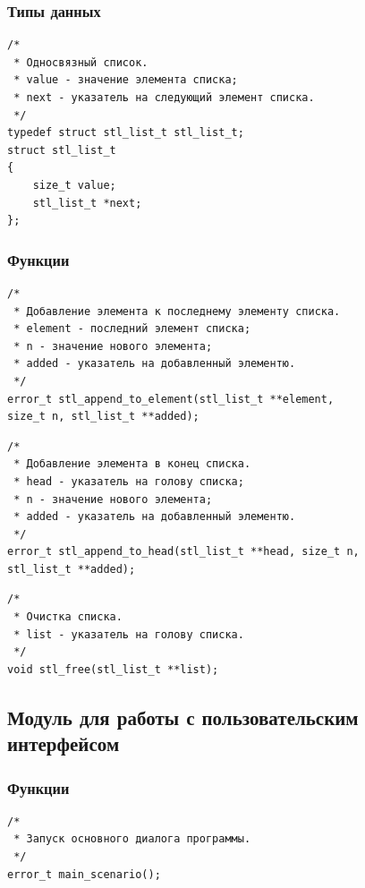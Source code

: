 \documentclass[a4paper,12pt]{extarticle}
\begin{document}
\subsubsection{Типы данных}
\begin{verbatim}
/*
 * Односвязный список.
 * value - значение элемента списка;
 * next - указатель на следующий элемент списка.
 */
typedef struct stl_list_t stl_list_t;
struct stl_list_t
{
    size_t value;
    stl_list_t *next;
};
\end{verbatim}




\subsubsection{Функции}
\begin{verbatim}
/*
 * Добавление элемента к последнему элементу списка.
 * element - последний элемент списка;
 * n - значение нового элемента;
 * added - указатель на добавленный элементю.
 */
error_t stl_append_to_element(stl_list_t **element, 
size_t n, stl_list_t **added);
\end{verbatim}


 \vspace{0.5cm}

\begin{verbatim}
/*
 * Добавление элемента в конец списка.
 * head - указатель на голову списка;
 * n - значение нового элемента;
 * added - указатель на добавленный элементю.
 */
error_t stl_append_to_head(stl_list_t **head, size_t n,
stl_list_t **added);
\end{verbatim}


 \vspace{0.5cm}

\begin{verbatim}
/*
 * Очистка списка.
 * list - указатель на голову списка.
 */
void stl_free(stl_list_t **list);
\end{verbatim}


 \vspace{0.5cm}

\subsection{Модуль для работы с пользовательским интерфейсом}
\subsubsection{Функции}
\begin{verbatim}
/*
 * Запуск основного диалога программы.
 */
error_t main_scenario();
\end{verbatim}
\end{document}
